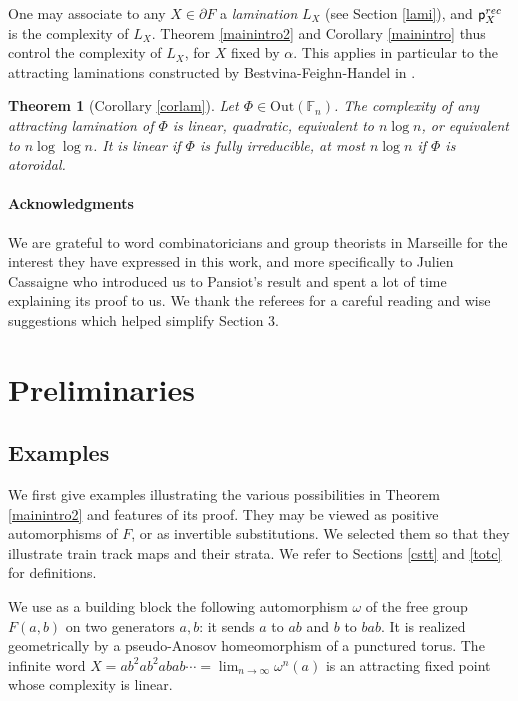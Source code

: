 \documentclass[11pt]{amsart}
\newtheorem{thm}{Theorem}[section]
\theoremstyle{remark}
\newcommand{\Out} {{\mathrm{Out}}}
\newcommand{\pr}{\cp^{rec}}
\newcommand{\cp}{{\sf  p}}
\newcommand {\F} {{\mathbb {F}}}
\newcommand{\bo}{\partial}
\begin{document}
One may associate to any $X\in \bo F$ a \emph{lamination} $L_X$ (see Section \ref{lami}), and $\pr_X$ is the complexity of $L_X$.  
  Theorem  \ref{mainintro2} and   Corollary  \ref{mainintro} thus control the complexity of $L_X$, for $X$ fixed by $\alpha$. This applies in particular to the attracting laminations constructed by Bestvina-Feighn-Handel in \cite{Tits1}. 


\begin{thm} [Corollary \ref{corlam}]
 Let $\Phi\in\Out(\F_n)$.
 The complexity of any attracting lamination of   $\Phi$ is linear, quadratic, equivalent to $n\log n$, or equivalent to $n\log \log n$. It is linear if $\Phi$ is fully irreducible, at most $n\log n$ if $\Phi$ is atoroidal.
\end{thm}

 \bigskip

\paragraph{Acknowledgments}
We are grateful to word combinatoricians and group theorists in Marseille for the interest they have expressed in this work, and more specifically to Julien Cassaigne who introduced us to Pansiot's result and spent a lot of time explaining  its proof to us.
We thank the referees for a careful reading and wise suggestions which helped simplify Section 3. 

 
 
 \section{Preliminaries}
 
 


\subsection{Examples} \label{examp}

 

   We first give examples illustrating the various possibilities in   Theorem \ref{mainintro2}  
   and features of its proof. They may be viewed as positive automorphisms of  $F$, or as invertible substitutions.  We selected them so that they illustrate train track maps and their strata. We refer to Sections \ref{cstt} and \ref{totc}
 for definitions.


We use as a building block the following automorphism $\omega$ of the free group $F(a,b)$ on two generators $a,b$: it sends $a$ to $ab$ and $b$ to $bab$. It is realized geometrically by a pseudo-Anosov homeomorphism of a punctured torus.  The infinite word $X=ab^2ab^2abab\cdots=\lim_{n\to\infty}\omega^n(a)$ is an attracting fixed point whose complexity is linear.  
 
\end{document}
